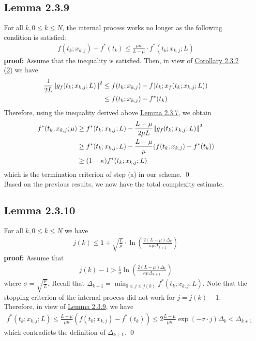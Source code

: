 \documentclass[12pt,a4paper]{article}
\begin{document}
	 \subsection*{Lemma 2.3.9}\label{lem239}
	 For all $k, 0 \leq k \leq N$, the internal process works no longer as the following condition is satisfied:
	 \begin{align}
	 	f(t_k;x_{k,j}) - f^*(t_k) \leq \frac{\mu \kappa}{L - \mu}\cdot f^*(t_k;x_{k,j};L)
	 \end{align}
	 \textbf{proof:} Assume that the inequality is satisfied. Then, in view of \hyperref[cor232_2]{Corollary 2.3.2 (2)} we have
	 \begin{align*}
	 	\frac{1}{2L}\norm{g_f(t_k;x_{k,j};L)}^2 &\leq f(t_k;x_{k,j}) - f(t_k;x_f(t_k;x_{k,j};L)) \\
	 	&\leq f(t_k;x_{k,j}) - f^*(t_k)
	 \end{align*}
	 Therefore, using the inequality derived above \hyperref[lem237]{Lemma 2.3.7}, we obtain
	 \begin{align*}
	 	f^*(t_k;x_{k,j};\mu) &\geq f^*(t_k;x_{k,j};L) - \frac{L - \mu}{2\mu L}\norm{g_f(t_k;x_{k,j};L)}^2 \\
	 	&\geq f^*(t_k;x_{k,j};L) - \frac{L - \mu}{\mu}(f(t_k;x_{k,j}) - f^*(t_k)) \\
	 	& \geq (1 - \kappa)f^*(t_k;x_{k,j};L)
	 \end{align*}
	 which is the termination criterion of step (a) in our scheme. \qed \\
	 Based on the previous results, we now have the total complexity estimate.
	 \subsection*{Lemma 2.3.10}\label{lem2310}
	 For all $k, 0 \leq k \leq N$ we have
	 \begin{align*}
	 	j(k) \leq 1 + \sqrt{\frac{L}{\mu}}\cdot \ln(\frac{2(L - \mu)\Delta_k}{\kappa \mu \Delta_{k+1}})
	 \end{align*}
	 \textbf{proof:} Assume that
	 \begin{align*}
	 	j(k) - 1 > \frac{1}{\sigma}\ln(\frac{2(L - \mu)\Delta_k}{\kappa \mu \Delta_{k+1}})
	 \end{align*}
	 where $\sigma = \sqrt{\frac{\mu}{L}}$. Recall that $\Delta_{k+1} = \min_{0 \leq j \leq j(k)}f^*(t_k;x_{k,j};L)$. Note that the stopping criterion of the internal process did not work for $j = j(k) - 1$. Therefore, in view of \hyperref[lem239]{Lemma 2.3.9}, we have
	 \begin{align*}
	 	f^*(t_k;x_{k,j};L) \leq \frac{L - \mu}{\mu \kappa}(f(t_k;x_{k,j}) - f^*(t_k)) \leq 2 \frac{L-\mu}{\mu \kappa}\exp(- \sigma \cdot j)\Delta_k < \Delta_{k+1}
	 \end{align*}
	 which contradicts the definition of $\Delta_{k+1}$. \qed \\
\end{document}
